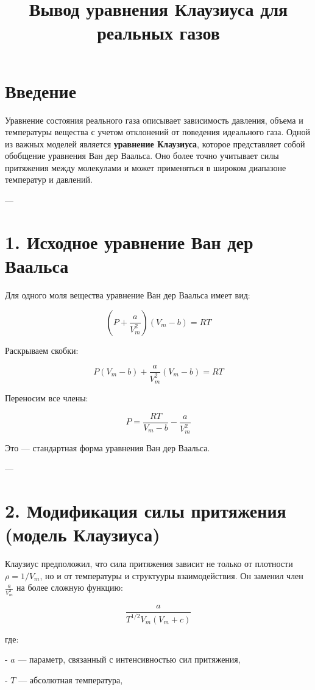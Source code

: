 \documentclass[12pt]{article}
\title{Вывод уравнения Клаузиуса для реальных газов}
\date{}
\begin{document}
\maketitle

\section*{Введение}

Уравнение состояния реального газа описывает зависимость давления, объема и температуры вещества с учетом отклонений от поведения идеального газа. Одной из важных моделей является \textbf{уравнение Клаузиуса}, которое представляет собой обобщение уравнения Ван дер Ваальса. Оно более точно учитывает силы притяжения между молекулами и может применяться в широком диапазоне температур и давлений.

---

\section*{1. Исходное уравнение Ван дер Ваальса}

Для одного моля вещества уравнение Ван дер Ваальса имеет вид:

$$
\left( P + \frac{a}{V_m^2} \right)(V_m - b) = RT
$$

Раскрываем скобки:

$$
P(V_m - b) + \frac{a}{V_m^2}(V_m - b) = RT
$$

Переносим все члены:

$$
P = \frac{RT}{V_m - b} - \frac{a}{V_m^2}
$$

Это — стандартная форма уравнения Ван дер Ваальса.

---

\section*{2. Модификация силы притяжения (модель Клаузиуса)}

Клаузиус предположил, что сила притяжения зависит не только от плотности $ \rho = 1/V_m $, но и от температуры и структууры взаимодействия. Он заменил член $ \frac{a}{V_m^2} $ на более сложную функцию:

$$
\frac{a}{T^{1/2} V_m (V_m + c)}
$$

где:

    
- $ a $ — параметр, связанный с интенсивностью сил притяжения,
    
- $ T $ — абсолютная температура,
    
\end{document}
